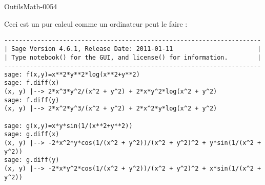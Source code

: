 
\begin{corrige}{OutilsMath-0054}

    Ceci est un pur calcul comme un ordinateur peut le faire :
    \begin{verbatim}
----------------------------------------------------------------------
| Sage Version 4.6.1, Release Date: 2011-01-11                       |
| Type notebook() for the GUI, and license() for information.        |
----------------------------------------------------------------------
sage: f(x,y)=x**2*y**2*log(x**2+y**2)
sage: f.diff(x)
(x, y) |--> 2*x^3*y^2/(x^2 + y^2) + 2*x*y^2*log(x^2 + y^2)
sage: f.diff(y)                
(x, y) |--> 2*x^2*y^3/(x^2 + y^2) + 2*x^2*y*log(x^2 + y^2) 

sage: g(x,y)=x*y*sin(1/(x**2+y**2))
sage: g.diff(x)
(x, y) |--> -2*x^2*y*cos(1/(x^2 + y^2))/(x^2 + y^2)^2 + y*sin(1/(x^2 + y^2))
sage: g.diff(y)
(x, y) |--> -2*x*y^2*cos(1/(x^2 + y^2))/(x^2 + y^2)^2 + x*sin(1/(x^2 + y^2))
    \end{verbatim}

\end{corrige}
